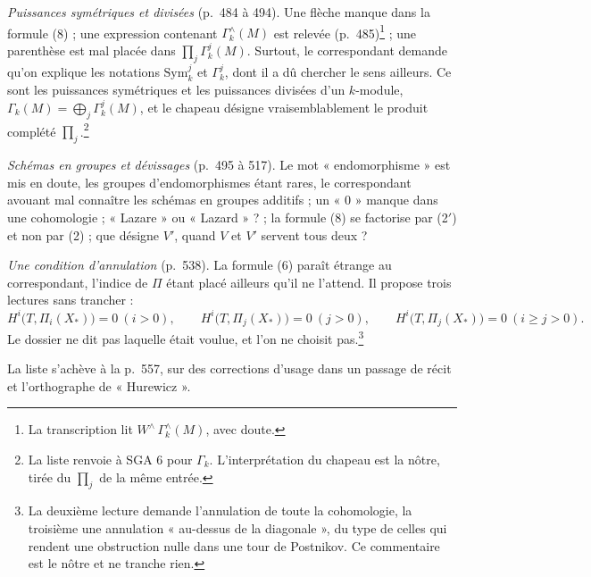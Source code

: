 \documentclass[11pt,a4paper]{article}
\begin{document}
\emph{Puissances symétriques et divisées} (p.\ 484 à 494). Une flèche manque
dans la formule (8) ; une expression contenant $\Gamma^{\wedge}_{k}(M)$ est
relevée (p.\ 485)\footnote{La transcription lit
$W^{\wedge}\,\Gamma^{\wedge}_{k}(M)$, avec doute.} ; une parenthèse est mal
placée dans $\prod_{j} \Gamma^{j}_{k}(M)$. Surtout, le correspondant demande
qu'on explique les notations $\mathrm{Sym}^{j}_{k}$ et $\Gamma^{j}_{k}$, dont
il a dû chercher le sens ailleurs. Ce sont les puissances symétriques et les
puissances divisées d'un $k$-module, $\Gamma_{k}(M) = \bigoplus_{j}
\Gamma^{j}_{k}(M)$, et le chapeau désigne vraisemblablement le produit
complété $\prod_{j}$.\footnote{La liste renvoie à SGA 6 pour $\Gamma_{k}$.
L'interprétation du chapeau est la nôtre, tirée du $\prod_{j}$ de la même
entrée.}

\emph{Schémas en groupes et dévissages} (p.\ 495 à 517). Le mot
« endomorphisme » est mis en doute, les groupes d'endomorphismes étant rares,
le correspondant avouant mal connaître les schémas en groupes additifs ; un
« 0 » manque dans une cohomologie ; « Lazare » ou « Lazard » ? ; la formule (8)
se factorise par (2$'$) et non par (2) ; que désigne $V'$, quand $V$ et $V'$
servent tous deux ?

\emph{Une condition d'annulation} (p.\ 538). La formule (6) paraît étrange au
correspondant, l'indice de $\Pi$ étant placé ailleurs qu'il ne l'attend. Il
propose trois lectures sans trancher :
\[
H^{i}\bigl(T, \Pi_{i}(X_{*})\bigr) = 0 \ (i > 0), \qquad
H^{i}\bigl(T, \Pi_{j}(X_{*})\bigr) = 0 \ (j > 0), \qquad
H^{i}\bigl(T, \Pi_{j}(X_{*})\bigr) = 0 \ (i \geq j > 0).
\]
Le dossier ne dit pas laquelle était voulue, et l'on ne choisit
pas.\footnote{La deuxième lecture demande l'annulation de toute la
cohomologie, la troisième une annulation « au-dessus de la diagonale », du
type de celles qui rendent une obstruction nulle dans une tour de Postnikov.
Ce commentaire est le nôtre et ne tranche rien.}

La liste s'achève à la p.\ 557, sur des corrections d'usage dans un passage
de récit et l'orthographe de « Hurewicz ».
\end{document}
